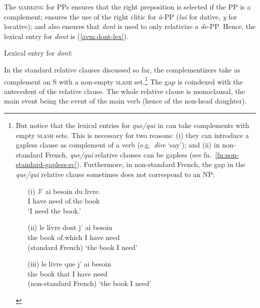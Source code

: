 The \textsc{marking} for PPs ensures that the right preposition is selected if the PP is a complement; ensures the use of the right clitic for \emph{à}-PP (\emph{lui} for dative, \emph{y} for locative); and also ensures that \emph{dont} is used to only relativize a \emph{de}-PP. Hence, the lexical entry for \emph{dont} is (\ref{avm:dont-lex}).


\ea Lexical entry for \emph{dont}:\nopagebreak

\label{avm:dont-lex}
\z 

In the standard relative clauses discussed so far, the complementizers take as complement an S with a non-empty \textsc{slash} set.\footnote{\label{fn:que-non-standard}But notice that the lexical entries for \emph{que/qui} in  can take complements with empty \textsc{slash} sets. This is necessary for two reasons: (i) they can introduce a gapless clause as complement of a verb (e.g.\ \emph{dire} `say'); and (ii) in non-standard French, \emph{que/qui} relative clauses can be gapless (see fn.\ \ref{fn:non-standard-gapless-rc}). Furthermore, in non-standard French, the gap in the \emph{que/qui} relative clause sometimes does not correspond to an NP:
\begin{itemize}
    \item[(i)] \gll J' ai besoin du livre.\\
    I have need of.the book\\
    \glt `I need the book.'
    \item[(ii)] \gll le livre dont j' ai besoin\\
    the book of.which I have need\\
    (standard French)
    \glt `the book I need'
    \item[(iii)] \gll le livre que j' ai besoin\\
    the book that I have need\\
    (non-standard French)
    \glt `the book I need'
\end{itemize}
} The gap is coindexed with the antecedent of the relative clause. The whole relative clause is monoclausal, the main event being the event of the main verb (hence of the non-head daughter).

